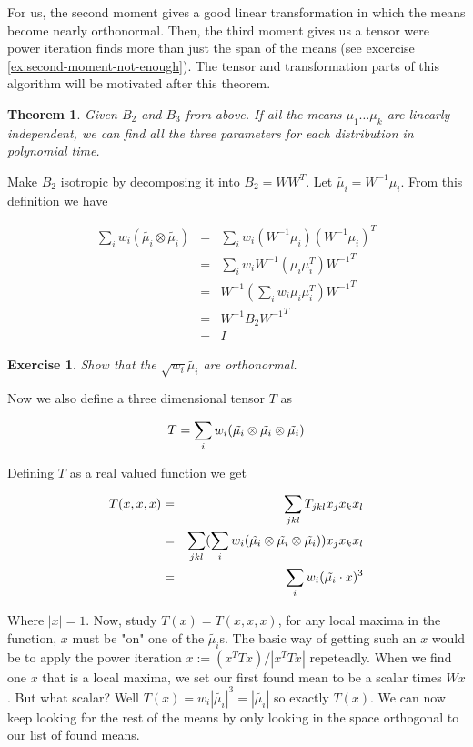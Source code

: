 \documentclass{book}
\newtheorem{theorem}{Theorem}[chapter]
\newtheorem{exercise}{Exercise}
\numberwithin{exercise}{chapter}
\begin{document}
For us, the second moment gives a good linear transformation in which the means
become nearly orthonormal. Then, the third moment gives us a tensor were power
iteration finds more than just the span of the means (see excercise
\ref{ex:second-moment-not-enough}). The tensor and transformation parts of this
algorithm will be motivated after this theorem.

\begin{theorem}\label{thm:learnmix}
  Given $B_2$ and $B_3$ from above. If all the means $\mu_1 \dots \mu_k$ are
  linearly independent, we can find all the three parameters for each
  distribution in polynomial time.
\end{theorem}

Make $B_2$ isotropic by decomposing it into $B_2 = W W^T$. Let $\tilde{\mu_i} =
W^{-1} \mu_i$. From this definition we have

\begin{eqnarray*}
  \sum_i w_i (\tilde{\mu_i} \otimes \tilde{\mu_i})
  &=& \sum_i w_i (W^{-1} \mu_i)(W^{-1} \mu_i)^T \\
  &=& \sum_i w_i W^{-1} (\mu_i \mu_i^T) {W^{-1}}^T \\
  &=& W^{-1} (\sum_i w_i \mu_i \mu_i^T) {W^{-1}}^T \\
  &=& W^{-1} B_2 {W^{-1}}^T \\
  &=& I
\end{eqnarray*}

\begin{exercise}
  Show that the $\sqrt{w_i} \tilde{\mu_i}$ are orthonormal.
\end{exercise}

Now we also define a three dimensional tensor $T$ as

\[
  T = \sum_i w_i ( \tilde{\mu_i}  \otimes  \tilde{\mu_i}  \otimes  \tilde{\mu_i} )
\]

Defining $T$ as a real valued function we get

\begin{eqnarray*}
  T(x, x, x)
  &=& \sum_{jkl} T_{jkl} x_j x_k x_l \\
  &=& \sum_{jkl} (\sum_i w_i ( \tilde{\mu_i}  \otimes  \tilde{\mu_i}  \otimes  \tilde{\mu_i} )) x_j x_k x_l \\
  &=& \sum_i w_i (\tilde{\mu_i} \cdot x)^3
\end{eqnarray*}

Where $|x| = 1$. Now, study $T(x) = T(x, x, x)$, for any local maxima in the
function, $x$ must be "on" one of the $\tilde{\mu_i}$s. The basic way of
getting such an $x$ would be to apply the power iteration $x := (x^T T
x)/|x^T T x|$ repeteadly. When we find one $x$ that is a local maxima,
we set our first found mean to be a scalar times $W x$. But what scalar?
Well $T(x) = w_i |\tilde{\mu_i}|^3 = |\tilde{\mu_i}|$ so exactly $T(x)$.
We can now keep looking for the rest of the means by only looking in the
space orthogonal to our list of found means.
\end{document}
